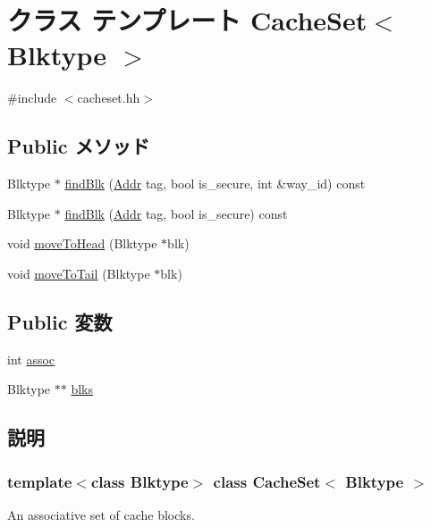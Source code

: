 \hypertarget{classCacheSet}{
\section{クラス テンプレート CacheSet$<$ Blktype $>$}
\label{classCacheSet}
}


{\ttfamily \#include $<$cacheset.hh$>$}\subsection*{Public メソッド}
\begin{DoxyCompactItemize}
\item 
Blktype $\ast$ \hyperlink{classCacheSet_a0536397551c228605cbb683c0d18971a}{findBlk} (\hyperlink{base_2types_8hh_af1bb03d6a4ee096394a6749f0a169232}{Addr} tag, bool is\_\-secure, int \&way\_\-id) const 
\item 
Blktype $\ast$ \hyperlink{classCacheSet_a393be734604995160749b784359a6ab0}{findBlk} (\hyperlink{base_2types_8hh_af1bb03d6a4ee096394a6749f0a169232}{Addr} tag, bool is\_\-secure) const 
\item 
void \hyperlink{classCacheSet_a36bd3b7504969f977b5f5a9c2d2d5413}{moveToHead} (Blktype $\ast$blk)
\item 
void \hyperlink{classCacheSet_abac25ca30812f3e15af829d389845946}{moveToTail} (Blktype $\ast$blk)
\end{DoxyCompactItemize}
\subsection*{Public 変数}
\begin{DoxyCompactItemize}
\item 
int \hyperlink{classCacheSet_a07d90beac0f56f39fbcff30aea1863d7}{assoc}
\item 
Blktype $\ast$$\ast$ \hyperlink{classCacheSet_a6e04ed065f754b0b10cbd1edfb239c64}{blks}
\end{DoxyCompactItemize}


\subsection{説明}
\subsubsection*{template$<$class Blktype$>$ class CacheSet$<$ Blktype $>$}

An associative set of cache blocks. 


